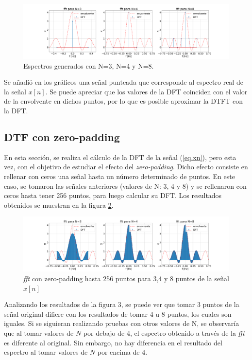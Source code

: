 \documentclass[11pt,a4paper]{article}
\begin{document}
    \begin{figure}[htb]
    \centering
    \includegraphics[width=\textwidth]{Img/punto_3_b.png}
    \caption{Espectros generados con N=3, N=4 y N=8.}
    \label{fig.3b}
    \end{figure}

    Se añadió en los gráficos una señal punteada que corresponde al espectro real de la señal $x[n]$.
    Se puede apreciar que los valores de la DFT coinciden con el valor de la envolvente en dichos puntos, por lo que es posible aproximar la DTFT con la DFT.

    \subsection{DTF con zero-padding}
    En esta sección, se realiza el cálculo de la DFT de la señal (\ref{eq.xn}), pero esta vez, con el objetivo de estudiar el efecto del \textit{zero-padding}. Dicho efecto consiste en rellenar con ceros una señal hasta un número determinado de puntos. En este caso, se tomaron las señales anteriores (valores de N: 3, 4 y 8) y se rellenaron con ceros hasta tener 256 puntos, para luego calcular su DFT. Los resultados obtenidos se muestran en la figura \ref{fig.1c}.
    
    \begin{figure}[htb]
    \centering
    \includegraphics[width=\textwidth]{Img/punto_3_c.png}
    \caption{\textit{fft} con zero-padding hasta 256 puntos para 3,4 y 8 puntos de la señal $x[n]$}
    \label{fig.1c}
    \end{figure}
    
    Analizando los resultados de la figura 3, se puede ver que tomar 3 puntos de la señal original difiere con los resultados de tomar 4 u 8 puntos, los cuales son iguales. Si se siguieran realizando pruebas con otros valores de N, se observaría que al tomar valores de $N$ por debajo de 4, el espectro obtenido a través de la \textit{fft} es diferente al original. Sin embargo, no hay diferencia en el resultado del espectro al tomar valores de $N$ por encima de 4.
    
\end{document}
